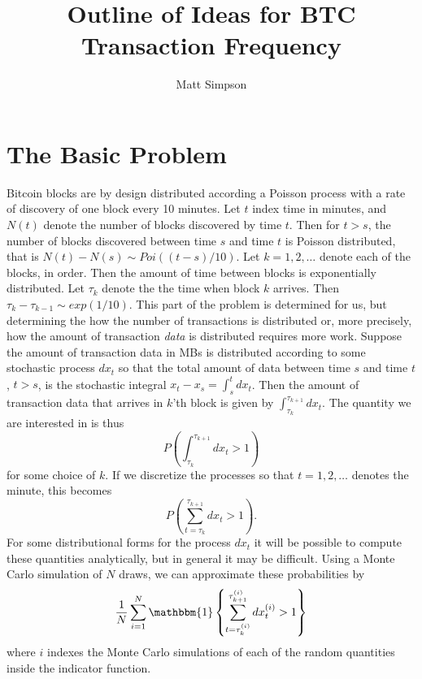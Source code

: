 \documentclass{article}
\author{Matt Simpson}
\title{Outline of Ideas for BTC Transaction Frequency}
\begin{document}
\maketitle


\section{The Basic Problem}
Bitcoin blocks are by design distributed according a Poisson process with a rate of discovery of one block every 10 minutes. Let $t$ index time in minutes, and $N(t)$ denote the number of blocks discovered by time $t$. Then for $t>s$, the number of blocks discovered between time $s$ and time $t$ is Poisson distributed, that is $N(t) - N(s) \sim Poi((t-s)/10)$. Let $k=1,2,\dots$ denote each of the blocks, in order. Then the amount of time between blocks is exponentially distributed. Let $\tau_k$ denote the the time when block $k$ arrives. Then $\tau_k - \tau_{k-1} \sim exp(1/10)$. This part of the problem is determined for us, but determining the how the number of transactions is distributed or, more precisely, how the amount of transaction {\it data} is distributed requires more work. Suppose the amount of transaction data in MBs is distributed according to some stochastic process $dx_t$ so that the total amount of data between time $s$ and time $t$, $t>s$, is the stochastic integral $x_t - x_s = \int_s^tdx_t$. Then the amount of transaction data that arrives in $k$'th block is given by $\int_{\tau_k}^{\tau_{k+1}}dx_t$. The quantity we are interested in is thus
\[
P\left(\int_{\tau_k}^{\tau_{k+1}}dx_t > 1\right)
\]
for some choice of $k$. If we discretize the processes so that $t=1,2,\dots$ denotes the minute, this becomes
\[
P\left(\sum_{t=\tau_{k}}^{\tau_{k+1}}dx_t > 1\right).
\]
For some distributional forms for the process $dx_t$ it will be possible to compute these quantities analytically, but in general it may be difficult. Using a Monte Carlo simulation of $N$ draws, we can approximate these probabilities by
\[
\frac{1}{N}\sum_{i=1}^N\mathbbm{1}\left\{\sum_{t=\tau_{k}^{(i)}}^{\tau_{k+1}^{(i)}}dx_{t}^{(i)} > 1\right\}
\]
where $i$ indexes the Monte Carlo simulations of each of the random quantities inside the indicator function. 
\end{document}
